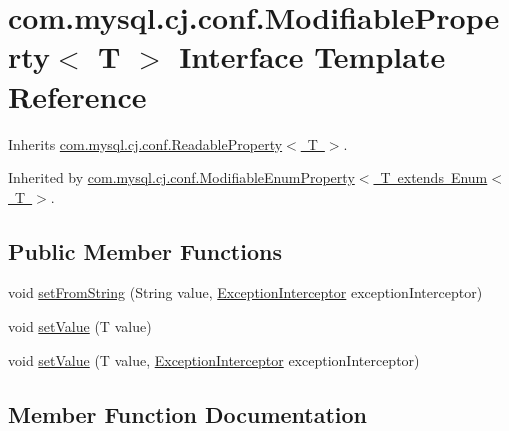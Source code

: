 \hypertarget{interfacecom_1_1mysql_1_1cj_1_1conf_1_1_modifiable_property}{}\section{com.\+mysql.\+cj.\+conf.\+Modifiable\+Property$<$ T $>$ Interface Template Reference}
\label{interfacecom_1_1mysql_1_1cj_1_1conf_1_1_modifiable_property}


Inherits \mbox{\hyperlink{interfacecom_1_1mysql_1_1cj_1_1conf_1_1_readable_property}{com.\+mysql.\+cj.\+conf.\+Readable\+Property$<$ T $>$}}.



Inherited by \mbox{\hyperlink{classcom_1_1mysql_1_1cj_1_1conf_1_1_modifiable_enum_property}{com.\+mysql.\+cj.\+conf.\+Modifiable\+Enum\+Property$<$ T extends Enum$<$ T $>$}}.

\subsection*{Public Member Functions}
\begin{DoxyCompactItemize}
\item 
void \mbox{\hyperlink{interfacecom_1_1mysql_1_1cj_1_1conf_1_1_modifiable_property_a98d38e3f47ed6218fe95171b3790d801}{set\+From\+String}} (String value, \mbox{\hyperlink{interfacecom_1_1mysql_1_1cj_1_1exceptions_1_1_exception_interceptor}{Exception\+Interceptor}} exception\+Interceptor)
\item 
void \mbox{\hyperlink{interfacecom_1_1mysql_1_1cj_1_1conf_1_1_modifiable_property_a22d1b9332f523a15f3edf432b36e4e07}{set\+Value}} (T value)
\item 
void \mbox{\hyperlink{interfacecom_1_1mysql_1_1cj_1_1conf_1_1_modifiable_property_a26fe9373efcddc22eb1fc1234eae81ed}{set\+Value}} (T value, \mbox{\hyperlink{interfacecom_1_1mysql_1_1cj_1_1exceptions_1_1_exception_interceptor}{Exception\+Interceptor}} exception\+Interceptor)
\end{DoxyCompactItemize}


\subsection{Member Function Documentation}
\mbox{\label{interfacecom_1_1mysql_1_1cj_1_1conf_1_1_modifiable_property_a98d38e3f47ed6218fe95171b3790d801}} 

